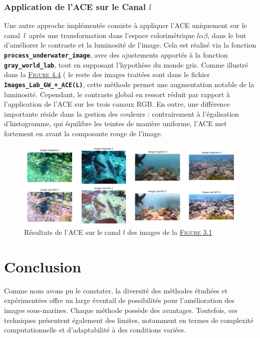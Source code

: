 \documentclass[10pt, a4paper]{extarticle}
\numberwithin{equation}{section}
\numberwithin{figure}{section}
\begin{document}
\subsubsection{Application de l'ACE sur le Canal \( l \)}

\par Une autre approche implémentée consiste à appliquer l'ACE uniquement sur le canal $\,l\,$ après une transformation dans l'espace colorimétrique $l\alpha\beta$, dans le but d'améliorer le contraste et la luminosité de l'image. Cela est réalisé via la fonction \colorbox{gray!15}{\texttt{\textbf{process\_underwater\_image}}}, avec des ajustements apportés à la fonction \colorbox{gray!15}{\texttt{\textbf{gray\_world\_lab}}}, tout en supposant l'hypothèse du monde gris. Comme illustré dans la \hyperref[figure4.4]{\textsc{Figure} 4.4} ( le reste des images traitées sont dans le fichier \colorbox{gray!15}{\texttt{\textbf{Images\_Lab\_GW\_+\_ACE(L)}}}, cette méthode permet une augmentation notable de la luminosité. Cependant, le contraste global en ressort réduit par rapport à l'application de l'ACE sur les trois canaux RGB. En outre, une différence importante réside dans la gestion des couleurs : contrairement à l'égalisation d'histogramme, qui équilibre les teintes de manière uniforme, l'ACE met fortement en avant la composante rouge de l'image. 

\begin{figure}[h!]
\begin{center}
\includegraphics[width=18cm]{image003.png}
\end{center}
\label{figure4.4}
\caption{Résultats de l'ACE sur le canal $l$ des images de la \hyperref[figure3.1]{\textsc{Figure} 3.1}}
\end{figure} 

\section{Conclusion}
\par Comme nous avons pu le constater, la diversité des méthodes étudiées et expérimentées offre un large éventail de possibilités pour l'amélioration des images sous-marines. Chaque méthode possède des avantages. Toutefois, ces techniques présentent également des limites, notamment en termes de complexité computationnelle et d'adaptabilité à des conditions variées.
\end{document}
